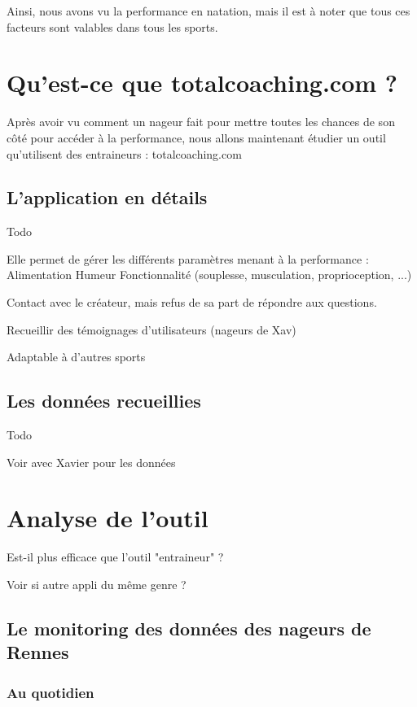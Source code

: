 \vspace{12pt}

Ainsi, nous avons vu la performance en natation, mais il est à noter que tous ces facteurs sont valables dans tous les sports.

\clearpage
\section{Qu’est-ce que totalcoaching.com ?}

Après avoir vu comment un nageur fait pour mettre toutes les chances de son côté pour accéder à la performance, nous allons maintenant étudier un outil qu'utilisent des entraineurs : totalcoaching.com

\subsection{L’application en détails}

Todo


Elle permet de gérer les différents paramètres menant à la performance :
Alimentation
Humeur
Fonctionnalité (souplesse, musculation, proprioception, ...)

Contact avec le créateur, mais refus de sa part de répondre aux questions.

Recueillir des témoignages d'utilisateurs (nageurs de Xav)

Adaptable à d'autres sports


\subsection{Les données recueillies}

Todo

Voir avec Xavier pour les données


\clearpage
\section{Analyse de l’outil}

Est-il plus efficace que l’outil "entraineur" ?

Voir si autre appli du même genre ?

\subsection{Le monitoring des données des nageurs de Rennes}
\subsubsection{Au quotidien}

